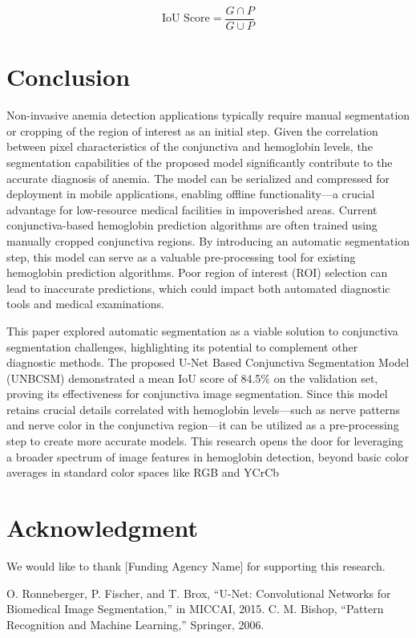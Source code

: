 \documentclass[conference]{IEEEtran}
\begin{document}
\begin{equation}
\text{IoU Score} = \frac{G \cap P}{G \cup P}
\end{equation}


\section{\textbf{Conclusion}}

Non-invasive anemia detection applications typically require manual segmentation or cropping of the region of interest as an initial step. Given the correlation between pixel characteristics of the conjunctiva and hemoglobin levels, the segmentation capabilities of the proposed model significantly contribute to the accurate diagnosis of anemia. The model can be serialized and compressed for deployment in mobile applications, enabling offline functionality—a crucial advantage for low-resource medical facilities in impoverished areas. Current conjunctiva-based hemoglobin prediction algorithms are often trained using manually cropped conjunctiva regions. By introducing an automatic segmentation step, this model can serve as a valuable pre-processing tool for existing hemoglobin prediction algorithms. Poor region of interest (ROI) selection can lead to inaccurate predictions, which could impact both automated diagnostic tools and medical examinations.

This paper explored automatic segmentation as a viable solution to conjunctiva segmentation challenges, highlighting its potential to complement other diagnostic methods. The proposed U-Net Based Conjunctiva Segmentation Model (UNBCSM) demonstrated a mean IoU score of 84.5\% on the validation set, proving its effectiveness for conjunctiva image segmentation. Since this model retains crucial details correlated with hemoglobin levels—such as nerve patterns and nerve color in the conjunctiva region—it can be utilized as a pre-processing step to create more accurate models. This research opens the door for leveraging a broader spectrum of image features in hemoglobin detection, beyond basic color averages in standard color spaces like RGB and YCrCb


\section*{Acknowledgment}
We would like to thank [Funding Agency Name] for supporting this research.

\begin{thebibliography}{00}
 O. Ronneberger, P. Fischer, and T. Brox, ``U-Net: Convolutional Networks for Biomedical Image Segmentation,'' in MICCAI, 2015.
 C. M. Bishop, ``Pattern Recognition and Machine Learning,'' Springer, 2006.
\end{thebibliography}
\end{document}

